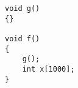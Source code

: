 \begin{Verbatim}[frame=single,fontsize=\small]
void g()
{}

void f()
{
    g();
    int x[1000];
}
\end{Verbatim}
    
